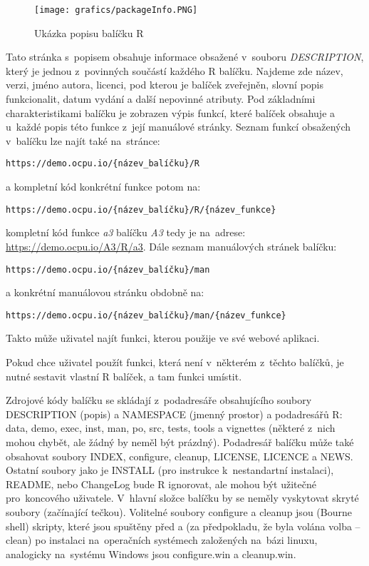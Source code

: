 \documentclass[thesis=B,czech]{FITthesis}[2012/06/26]
\begin{document}
\begin{figure}[ht]
    \centering
    \texttt{[image: grafics/packageInfo.PNG]}
    \caption{Ukázka popisu balíčku R \cite{info}}
\end{figure}

Tato stránka s~popisem obsahuje informace obsažené v~souboru \textit{DESCRIPTION}, který je jednou z~povinných součástí každého R balíčku. Najdeme zde název, verzi, jméno autora, licenci, pod kterou je balíček zveřejněn, slovní popis funkcionalit, datum vydání a další nepovinné atributy. Pod základními charakteristikami balíčku je zobrazen výpis funkcí, které balíček obsahuje a u~každé popis této funkce z~její manuálové stránky. Seznam funkcí obsažených v~balíčku lze najít také na~stránce: 
\begin{verbatim}
https://demo.ocpu.io/{název_balíčku}/R
\end{verbatim}
a kompletní kód konkrétní funkce potom na:
\begin{verbatim}
https://demo.ocpu.io/{název_balíčku}/R/{název_funkce}
\end{verbatim}
kompletní kód funkce \textit{a3} balíčku \textit{A3} tedy je na~adrese: \url{https://demo.ocpu.io/A3/R/a3}. Dále seznam manuálových stránek balíčku: 
\begin{verbatim}
https://demo.ocpu.io/{název_balíčku}/man
\end{verbatim}
a konkrétní manuálovou stránku obdobně na:
\begin{verbatim}
https://demo.ocpu.io/{název_balíčku}/man/{název_funkce}
\end{verbatim}
Takto může uživatel najít funkci, kterou použije ve své webové aplikaci.

Pokud chce uživatel použít funkci, která není v~některém z~těchto balíčků, je nutné sestavit vlastní R balíček, a tam funkci umístit. 

Zdrojové kódy balíčku se skládají z~podadresáře obsahujícího soubory DESCRIPTION (popis) a NAMESPACE (jmenný prostor) a podadresářů R: data, demo, exec, inst, man, po, src, tests, tools a vignettes (některé z~nich mohou chybět, ale žádný by neměl být prázdný). Podadresář balíčku může také obsahovat soubory INDEX, configure, cleanup, LICENSE, LICENCE a NEWS. Ostatní soubory jako je INSTALL (pro instrukce k~nestandartní instalaci), README, nebo ChangeLog bude R ignorovat, ale mohou být užitečné pro~koncového uživatele. V~hlavní složce balíčku by se neměly vyskytovat skryté soubory (začínající tečkou). Volitelné soubory configure a cleanup jsou (Bourne shell) skripty, které jsou spuštěny před a (za předpokladu, že byla volána volba --clean) po instalaci na~operačních systémech založených na~bázi linuxu, analogicky na~systému Windows jsou configure.win a cleanup.win.
\end{document}
